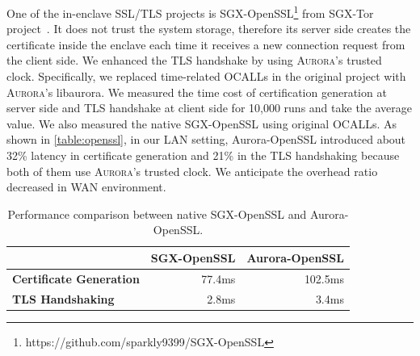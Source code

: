 One of the in-enclave SSL/TLS projects is SGX-OpenSSL\footnote{https://github.com/sparkly9399/SGX-OpenSSL} from SGX-Tor project~\cite{DBLP:conf/nsdi/KimHHKH17}. It does not trust the system storage, therefore its server side creates the certificate inside the enclave each time it receives a new connection request from the client side. We enhanced the TLS handshake by using \textsc{Aurora}'s trusted clock. Specifically, we replaced time-related OCALLs in the original project with \textsc{Aurora}'s libaurora. %
We measured the time cost of certification generation at server side and TLS handshake at client side for 10,000 runs and take the average value. We also measured the native SGX-OpenSSL using original OCALLs. As shown in \autoref{table:openssl}, in our LAN setting, Aurora-OpenSSL introduced about 32\% latency in certificate generation and 21\% in the TLS handshaking because both of them use \textsc{Aurora}'s trusted clock. We anticipate the overhead ratio decreased in WAN environment.

\begin{table}[t]
	\centering
	\caption{Performance comparison between native SGX-OpenSSL and Aurora-OpenSSL.}
	\label{table:openssl}
	\small
	\begin{tabular}{lrr}
		\toprule
		& \textbf{SGX-OpenSSL} & \textbf{Aurora-OpenSSL} \\
		\midrule
		\textbf{Certificate Generation} & 77.4ms & 102.5ms \\
		\textbf{TLS Handshaking} & 2.8ms & 3.4ms \\
		\bottomrule
	\end{tabular}
\end{table}

